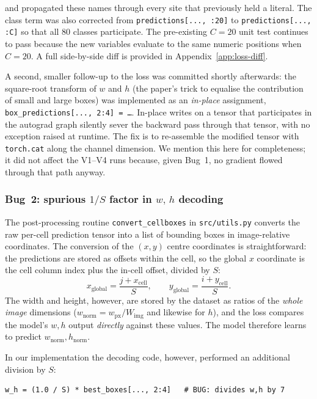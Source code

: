 \noindent and propagated these names through every site that previously held a
literal. The class term was also corrected from
\texttt{predictions[..., :20]} to \texttt{predictions[..., :C]} so that all 80
classes participate. The pre-existing $C=20$ unit test continues to pass
because the new variables evaluate to the same numeric positions when $C=20$.
A full side-by-side diff is provided in Appendix~\ref{app:loss-diff}.

A second, smaller follow-up to the loss was committed shortly afterwards: the
square-root transform of $w$ and $h$ (the paper's trick to equalise the
contribution of small and large boxes) was implemented as an \emph{in-place}
assignment, \texttt{box\_predictions[..., 2:4] = \ldots}. In-place writes on a
tensor that participates in the autograd graph silently sever the backward
pass through that tensor, with no exception raised at runtime. The fix is to
re-assemble the modified tensor with \texttt{torch.cat} along the channel
dimension. We mention this here for completeness; it did not affect the V1--V4
runs because, given Bug~1, no gradient flowed through that path anyway.

\subsubsection{Bug~2: spurious \texorpdfstring{$1/S$}{1/S} factor in \texorpdfstring{$w,\,h$}{w, h} decoding}
\label{sec:bug:wh-decoding}

The post-processing routine \texttt{convert\_cellboxes} in
\texttt{src/utils.py} converts the raw per-cell prediction tensor into a list
of bounding boxes in image-relative coordinates. The conversion of the
$(x, y)$ centre coordinates is straightforward: the predictions are stored as
offsets within the cell, so the global $x$ coordinate is the cell column index
plus the in-cell offset, divided by $S$:
\[
  x_{\text{global}} = \frac{j + x_{\text{cell}}}{S}, \qquad
  y_{\text{global}} = \frac{i + y_{\text{cell}}}{S}.
\]
The width and height, however, are stored by the dataset as ratios of the
\emph{whole image} dimensions ($w_{\text{norm}} = w_{\text{px}}/W_{\text{img}}$
and likewise for $h$), and the loss compares the model's $w,h$ output
\emph{directly} against these values. The model therefore learns to predict
$w_{\text{norm}}, h_{\text{norm}}$.

In our implementation the decoding code, however, performed an additional
division by $S$:
\begin{lstlisting}
w_h = (1.0 / S) * best_boxes[..., 2:4]   # BUG: divides w,h by 7
\end{lstlisting}

